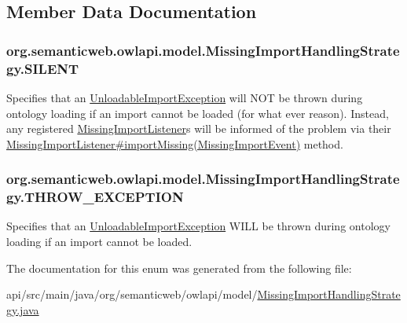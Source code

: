 \subsection{Member Data Documentation}
\hypertarget{enumorg_1_1semanticweb_1_1owlapi_1_1model_1_1_missing_import_handling_strategy_aed66060ec95dc4ad59ca4dd82509782b}{
\subsubsection[{S\-I\-L\-E\-N\-T}]{\setlength{\rightskip}{0pt plus 5cm}org.\-semanticweb.\-owlapi.\-model.\-Missing\-Import\-Handling\-Strategy.\-S\-I\-L\-E\-N\-T}}\label{enumorg_1_1semanticweb_1_1owlapi_1_1model_1_1_missing_import_handling_strategy_aed66060ec95dc4ad59ca4dd82509782b}
Specifies that an \hyperlink{classorg_1_1semanticweb_1_1owlapi_1_1model_1_1_unloadable_import_exception}{Unloadable\-Import\-Exception} will N\-O\-T be thrown during ontology loading if an import cannot be loaded (for what ever reason). Instead, any registered \hyperlink{interfaceorg_1_1semanticweb_1_1owlapi_1_1model_1_1_missing_import_listener}{Missing\-Import\-Listener}s will be informed of the problem via their \hyperlink{interfaceorg_1_1semanticweb_1_1owlapi_1_1model_1_1_missing_import_listener_ae0cc62b69dbc761d5ae47946b2ac050d}{Missing\-Import\-Listener\#import\-Missing(\-Missing\-Import\-Event)} method. \hypertarget{enumorg_1_1semanticweb_1_1owlapi_1_1model_1_1_missing_import_handling_strategy_a28783f8ec58145f2d48186f718570163}{
\subsubsection[{T\-H\-R\-O\-W\-\_\-\-E\-X\-C\-E\-P\-T\-I\-O\-N}]{\setlength{\rightskip}{0pt plus 5cm}org.\-semanticweb.\-owlapi.\-model.\-Missing\-Import\-Handling\-Strategy.\-T\-H\-R\-O\-W\-\_\-\-E\-X\-C\-E\-P\-T\-I\-O\-N}}\label{enumorg_1_1semanticweb_1_1owlapi_1_1model_1_1_missing_import_handling_strategy_a28783f8ec58145f2d48186f718570163}
Specifies that an \hyperlink{classorg_1_1semanticweb_1_1owlapi_1_1model_1_1_unloadable_import_exception}{Unloadable\-Import\-Exception} W\-I\-L\-L be thrown during ontology loading if an import cannot be loaded. 

The documentation for this enum was generated from the following file\-:\begin{DoxyCompactItemize}
\item 
api/src/main/java/org/semanticweb/owlapi/model/\hyperlink{_missing_import_handling_strategy_8java}{Missing\-Import\-Handling\-Strategy.\-java}\end{DoxyCompactItemize}
